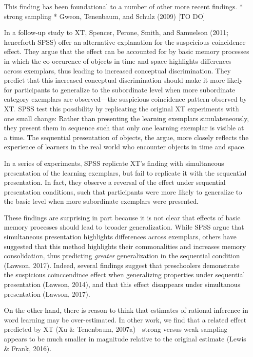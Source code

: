 \documentclass[english,floatsintext,man]{apa6}
\theoremstyle{definition}
\theoremstyle{definition}
\theoremstyle{remark}
\begin{document}
This finding has been foundational to a number of other more recent
findings. * strong sampling * Gweon, Tenenbaum, and Schulz (2009) {[}TO
DO{]}

In a follow-up study to XT, Spencer, Perone, Smith, and Samuelson (2011;
henceforth SPSS) offer an alternative explanation for the suspcicious
coincidence effect. They argue that the effect can be accounted for by
basic memory processes in which the co-occurence of objects in time and
space highlights differences across exemplars, thus leading to increased
conceptual discrimination. They predict that this increased conceptual
discrimination should make it more likely for participants to generalize
to the subordinate level when more subordinate category exemplars are
observed---the suspicious coincidence pattern observed by XT. SPSS test
this possibility by replicating the original XT experiments with one
small change: Rather than presenting the learning exemplars
simulateneously, they present them in sequence such that only one
learning exemplar is visible at a time. The sequential presentation of
objects, the argue, more closely reflects the experience of learners in
the real world who encounter objects in time and space.

In a series of experiments, SPSS replicate XT's finding with
simultaneous presentation of the learning exemplars, but fail to
replicate it with the sequential presentation. In fact, they observe a
reversal of the effect under sequential presentation conditions, such
that participants were more likely to generalize to the basic level when
more subordinate exemplars were presented.

These findings are surprising in part because it is not clear that
effects of basic memory processes should lead to broader generalization.
While SPSS argue that simultaneous presentation highlights differences
across exemplars, others have suggested that this method highlights
their commonalities and increases memory consolidation, thus predicting
\emph{greater} generalization in the sequential condition (Lawson,
2017). Indeed, several findings suggest that preschoolers demonstrate
the suspicious coinccendince effect when generalizing properties under
sequential presentation (Lawson, 2014), and that this effect disappears
under simultanous presentation (Lawson, 2017).

On the other hand, there is reason to think that estimates of rational
inference in word learning may be over-estimated. In other work, we find
that a related effect predicted by XT (Xu \& Tenenbaum, 2007a)---strong
versus weak sampling---appears to be much smaller in magnitude relative
to the original estimate (Lewis \& Frank, 2016).
\end{document}
